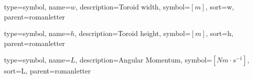{
	type=symbol, %
	name={\ensuremath{w}}, %
	description={Toroid width}, %
	symbol={$\left[m\right]$}, %
	sort=w, %
	parent=romanletter %
}

{
	type=symbol, %
	name={\ensuremath{h}}, %
	description={Toroid height}, %
	symbol={$\left[m\right]$}, %
	sort=h, %
	parent=romanletter %
}

{
	type=symbol, %
	name={\ensuremath{L}}, %
	description={Angular Momentum}, %
	symbol={$\left[Nm\cdot s^{-1}\right]$}, %
	sort=L, %
	parent=romanletter %
}

